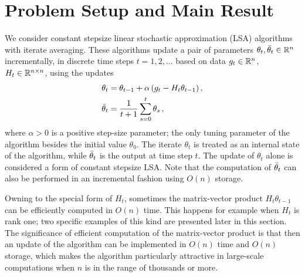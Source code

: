 \section{Problem Setup and Main Result}\label{sec:prob}
%
We consider constant stepsize linear stochastic approximation (LSA) algorithms with iterate averaging.
These algorithms update a pair of parameters $\theta_t,\bar{\theta}_t\in \mathbb{R}^n$ incrementally, in discrete time steps $t=1,2,\dots$
based on data $g_t\in \mathbb{R}^n$, $H_t\in \mathbb{R}^{n\times n}$, using the updates
\begin{subequations}
\label{eq:lsa} %
\begin{align}
\theta_{t} & =\theta_{t-1}+\alpha\,(g_t-H_t\theta_{t-1})\,, \label{eq:lsa1}\\
 \bar{\theta}_t & =  \frac{1}{t+1}\sum_{s=0}^{t} \theta_s\,, \label{eq:rp}
\end{align}
\end{subequations}
where $\alpha>0$ is a positive step-size parameter; the only tuning parameter of the algorithm besides the 
initial value $\theta_0$.
The iterate $\theta_t$ is treated as an internal state of the algorithm, while $\bar{\theta}_t$ is the output at time step $t$.
The update of $\theta_t$ alone is considered a form of constant stepsize LSA.
Note that the computation of $\bar{\theta}_t$ can also be performed in an incremental fashion using $O(n)$ storage.

Owning to the special form of $H_t$, sometimes the matrix-vector product $H_t \theta_{t-1}$ 
can be efficiently computed in $O(n)$ time.
This happens for example when $H_t$ is rank one; two specific examples of this kind are presented later in this section.
The significance of efficient computation of the matrix-vector product is that then an update of the algorithm
can be implemented in $O(n)$ time and $O(n)$ storage,
which makes the algorithm particularly attractive in large-scale computations when $n$ is in the range of thousands or more.

